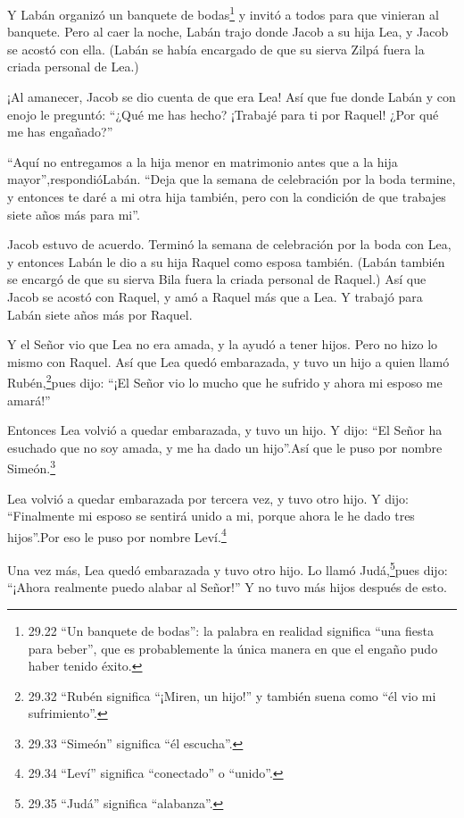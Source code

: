  Y Labán organizó un banquete de bodas\footnote{29.22 ``Un
  banquete de bodas'': la palabra en realidad significa ``una fiesta
  para beber'', que es probablemente la única manera en que el engaño
  pudo haber tenido éxito.} y invitó a todos para que vinieran al
banquete.  Pero al caer la noche, Labán trajo donde Jacob a
su hija Lea, y Jacob se acostó con ella.  (Labán se había
encargado de que su sierva Zilpá fuera la criada personal de Lea.)

 ¡Al amanecer, Jacob se dio cuenta de que era Lea! Así que
fue donde Labán y con enojo le preguntó: ``¿Qué me has hecho? ¡Trabajé
para ti por Raquel! ¿Por qué me has engañado?''

 ``Aquí no entregamos a la hija menor en matrimonio antes
que a la hija mayor'',respondióLabán.  ``Deja que la semana
de celebración por la boda termine, y entonces te daré a mi otra hija
también, pero con la condición de que trabajes siete años más para mi''.

 Jacob estuvo de acuerdo. Terminó la semana de celebración
por la boda con Lea, y entonces Labán le dio a su hija Raquel como
esposa también.  (Labán también se encargó de que su sierva
Bila fuera la criada personal de Raquel.)  Así que Jacob se
acostó con Raquel, y amó a Raquel más que a Lea. Y trabajó para Labán
siete años más por Raquel.

 Y el Señor vio que Lea no era amada, y la ayudó a tener
hijos. Pero no hizo lo mismo con Raquel.  Así que Lea quedó
embarazada, y tuvo un hijo a quien llamó Rubén,\footnote{29.32 ``Rubén
  significa ``¡Miren, un hijo!'' y también suena como ``él vio mi
  sufrimiento''.}pues dijo: ``¡El Señor vio lo mucho que he sufrido y
ahora mi esposo me amará!''

 Entonces Lea volvió a quedar embarazada, y tuvo un hijo. Y
dijo: ``El Señor ha esuchado que no soy amada, y me ha dado un
hijo''.Así que le puso por nombre Simeón.\footnote{29.33 ``Simeón''
  significa ``él escucha''.}

 Lea volvió a quedar embarazada por tercera vez, y tuvo
otro hijo. Y dijo: ``Finalmente mi esposo se sentirá unido a mi, porque
ahora le he dado tres hijos''.Por eso le puso por nombre
Leví.\footnote{29.34 ``Leví'' significa ``conectado'' o ``unido''.}

 Una vez más, Lea quedó embarazada y tuvo otro hijo. Lo
llamó Judá,\footnote{29.35 ``Judá'' significa ``alabanza''.}pues dijo:
``¡Ahora realmente puedo alabar al Señor!'' Y no tuvo más hijos después
de esto.

